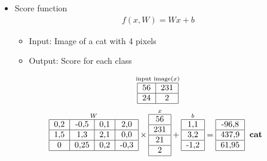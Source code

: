 \documentclass{scrartcl}
\begin{document}
\begin{itemize}
	\item Score function
	\begin{align*}
		f(x,W)=Wx+b
	\end{align*}
	\begin{itemize}
		\item Input: Image of a cat with 4 pixels
		\item Output: Score for each class
	\end{itemize}
	\begin{align*}
		\overset{\text{input image} (x)}{
			\begin{tabular}{|c|c|}
				\hline 
				56 & 231 \\ 
				\hline 
				24 & 2 \\ 
				\hline 
			\end{tabular}
		}
	\end{align*}
	\begin{align*}
		\overset{W}{
			\begin{tabular}{|c|c|c|c|}
				\hline 
				0,2 & -0,5 & 0,1 & 2,0 \\ 
				\hline 
				1,5 & 1,3 & 2,1 & 0,0 \\ 
				\hline 
				0 & 0,25 & 0,2 & -0,3 \\ 
				\hline 
			\end{tabular}
		}
		\times
		\overset{x}{
			\begin{tabular}{|c|}
				\hline 
				56 \\ 
				\hline 
				231 \\ 
				\hline 
				21 \\ 
				\hline 
				2 \\ 
				\hline 
			\end{tabular}
		}
		+
		\overset{b}{
			\begin{tabular}{|c|}
				\hline 
				1,1 \\ 
				\hline 
				3,2 \\ 
				\hline 
				-1,2 \\ 
				\hline 
			\end{tabular}
		}
		=
		\begin{tabular}{|c|}
			\hline 
			-96,8 \\ 
			\hline 
			437,9 \\ 
			\hline 
			61,95 \\ 
			\hline 
		\end{tabular} 
		\begin{tabular}{c}
			\textbf{cat} \\ 

\end{tabular}
\end{align*}
\end{itemize}
\end{document}
